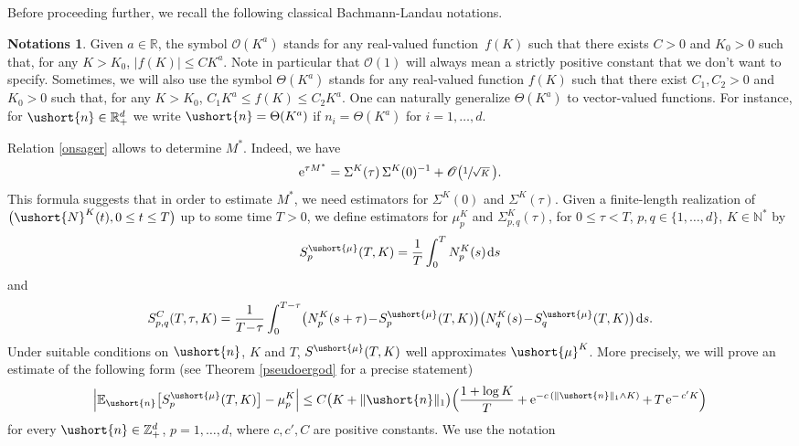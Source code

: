 \documentclass[10pt]{amsart}
\let\mathcal\mathscr
\numberwithin{equation}{section}
\theoremstyle{plain}
\theoremstyle{definition}
\newtheorem*{notations}{Notations}
\newcommand{\E}{{\mathbb{E}}}
\newcommand{\real}{\mathbb{R}}
\newcommand{\zentiers}{{\mathbb{Z}}}
\newcommand{\domaine}{\zentiers_{+}^{d}}
\newcommand{\rpd}{\mathbb{R}_+^d}
\newcommand{\Oun}{\mathcal{O}(1)}
\newcommand{\sK}{K}
\newcommand{\vecn}{\ushort{n}}
\newcommand{\vmu}{\ushort{\mu}}
\newcommand{\leproc}{\ushort{N}^{K}}
\newcommand{\e}{\operatorname{e}}
\newcommand{\dd}{\hspace{1pt}\mathrm{d}}
\newcommand{\norm}[1]{\|#1\|_{1}}\let\snorm\norm
\begin{document}
Before proceeding further, we recall the following classical Bachmann-Landau notations.
\begin{notations}
Given $a\in\real$, the symbol $\mathcal{O}(K^a)$ stands for any real-valued function~$f(K)$ such that
there exists $C>0$ and $K_0>0$ such that, for any $K>K_0$, $|f(K)|\leq C K^a$. Note in particular that $\Oun$ will always mean a strictly positive constant that we don't want to specify.
Sometimes, we will also use the symbol $\Theta(K^a)$ stands for any real-valued function $f(K)$ such that there exist $C_1,C_2>0$ and $K_0>0$
such that, for any $K>K_0$, $C_1 K^a\leq f(K)\leq C_2 K^a$. One can naturally generalize $\Theta(K^a)$ to vector-valued functions. For instance, for $
\vecn\in\rpd$ we write $\vecn=\Theta(K^a)$ if $n_i=\Theta(K^a)$ for $i=1,\ldots,d$.
\end{notations}
Relation \eqref{onsager} allows to determine $M^*$. Indeed, we have
\begin{equation}\label{matrix-onsager}
\e^{\tau M^*} = \Sigma^{\sK}(\tau)\,\Sigma^{\sK}(0)^{-1} + \mathcal{O}\bigl(\sfrac{1}{\sqrt{K}}\,\bigr).
\end{equation}
This formula suggests that in order to estimate $M^*$, we need estimators for $\Sigma^{\sK}(0)$ and $\Sigma^{\sK}(\tau)$.
Given a finite-length realization of $\bigl(\leproc(t), 0\le t\le T\bigr)$ up to some time $T>0$, we define estimators for
$\mu_{p}^{\sK}$ and $\Sigma^{\sK}_{p,q}(\tau)$,
for $0\le \tau<T$, $p,q\in\{1,\ldots, d\}$, $K\in \mathbb{N}^*$ by
\begin{equation}
\label{stat-mu}
S^{\vmu}_{p}(T,K) =\frac{1}{T}\int_{0}^{T}N_{p}^{\sK}(s) \dd s
\end{equation}
and
\begin{equation}\label{stat-sigma}
S^{C}_{p,q}(T,\tau,K) =\frac{1}{T\!-\!\tau}\int_{0}^{T-\tau}\bigl(N_{p}^{\sK}(s+\tau)\!-\!S^{\vmu}_{p}(T,K)\bigr)
\bigl(N_{q}^{\sK}(s)\!-\!S^{\vmu}_{q}(T,K)\bigr)\dd s.
\end{equation}
Under suitable conditions on $\vecn$, $K$ and $T$, $S^{\vmu}(T,K)$ well approximates $\vmu^{\sK}$.
More precisely, we will prove an estimate of the following form (see Theorem \ref{pseudoergod} for a precise statement)
\begin{equation}\label{control-est-mu}
\left|\E_{\vecn}\bigl[S^{\vmu}_{p}(T,K)\bigr]-\mu_p^{\sK}\right| \leq C\bigl(K+\norm{\vecn}\bigr)\Bigl(\frac{1+\log K}{T} + \e^{-c\,(\|\vecn\|_{1}\wedge K)}+\, T\e^{-\,c' K} \Bigr)
\end{equation}
for every $\vecn\in\domaine$, $p=1,\ldots,d$, where $c,c',C$ are positive constants. We use the notation
\end{document}
